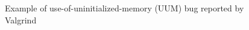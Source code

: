 \begin{figure}[h]
\caption{Example of use-of-uninitialized-memory (UUM) bug reported by Valgrind}
\label{fig:valgrind_example}
\end{figure}


